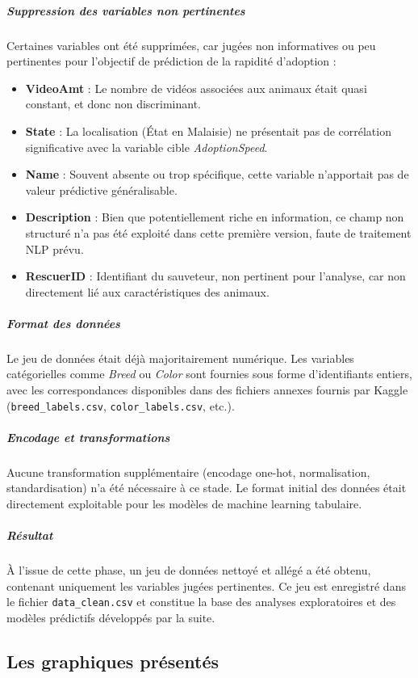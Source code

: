 \documentclass[a4paper,12pt]{article}
\begin{document}
\subparagraph{Suppression des variables non pertinentes}
Certaines variables ont été supprimées, car jugées non informatives ou peu pertinentes pour l’objectif de prédiction de la rapidité d’adoption :
\begin{itemize}
    \item \textbf{VideoAmt} : Le nombre de vidéos associées aux animaux était quasi constant, et donc non discriminant.
    \item \textbf{State} : La localisation (État en Malaisie) ne présentait pas de corrélation significative avec la variable cible \textit{AdoptionSpeed}.
    \item \textbf{Name} : Souvent absente ou trop spécifique, cette variable n'apportait pas de valeur prédictive généralisable.
    \item \textbf{Description} : Bien que potentiellement riche en information, ce champ non structuré n’a pas été exploité dans cette première version, faute de traitement NLP prévu.
    \item \textbf{RescuerID} : Identifiant du sauveteur, non pertinent pour l’analyse, car non directement lié aux caractéristiques des animaux.
\end{itemize}

\subparagraph{Format des données}

Le jeu de données était déjà majoritairement numérique. Les variables catégorielles comme \textit{Breed} ou \textit{Color} sont fournies sous forme d’identifiants entiers, avec les correspondances disponibles dans des fichiers annexes fournis par Kaggle (\texttt{breed\_labels.csv}, \texttt{color\_labels.csv}, etc.).

\subparagraph{Encodage et transformations}

Aucune transformation supplémentaire (encodage one-hot, normalisation, standardisation) n’a été nécessaire à ce stade. Le format initial des données était directement exploitable pour les modèles de machine learning tabulaire.

\subparagraph{Résultat}

À l’issue de cette phase, un jeu de données nettoyé et allégé a été obtenu, contenant uniquement les variables jugées pertinentes. Ce jeu est enregistré dans le fichier \texttt{data\_clean.csv} et constitue la base des analyses exploratoires et des modèles prédictifs développés par la suite.

\subsection{Les graphiques présentés}
\end{document}
